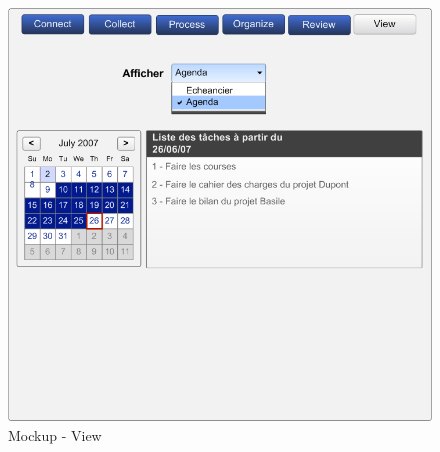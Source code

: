 \begin{figure}[H]
  \begin{center}
  \includegraphics[scale=0.5]{livrable2/images/view.png}
  \caption{Mockup - View}
  \end{center}
\end{figure}